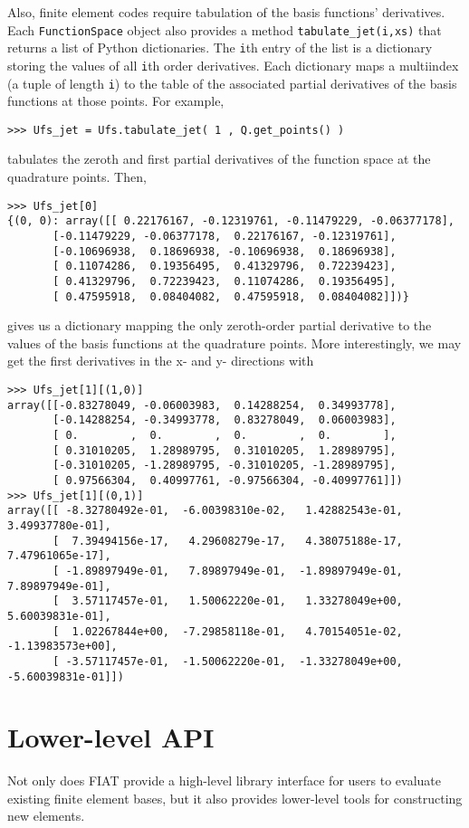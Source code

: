 \documentclass{fenicsmanual}
\begin{document}
Also, finite element codes require tabulation of the basis functions'
derivatives.  Each \verb/FunctionSpace/ object also provides a method
\verb/tabulate_jet(i,xs)/ that returns a list of Python dictionaries.
The \verb.i.th entry of the list is a dictionary storing the values of
all \verb.i.th order derivatives.  Each dictionary maps a multiindex
(a tuple of length \verb.i.) to the table of the associated partial
derivatives of the basis functions at those points.  For example,
\begin{verbatim}
>>> Ufs_jet = Ufs.tabulate_jet( 1 , Q.get_points() )
\end{verbatim}
tabulates the zeroth and first partial derivatives of the function
space at the quadrature points.  Then,
\begin{verbatim}
>>> Ufs_jet[0]
{(0, 0): array([[ 0.22176167, -0.12319761, -0.11479229, -0.06377178],
       [-0.11479229, -0.06377178,  0.22176167, -0.12319761],
       [-0.10696938,  0.18696938, -0.10696938,  0.18696938],
       [ 0.11074286,  0.19356495,  0.41329796,  0.72239423],
       [ 0.41329796,  0.72239423,  0.11074286,  0.19356495],
       [ 0.47595918,  0.08404082,  0.47595918,  0.08404082]])}
\end{verbatim}
gives us a dictionary mapping the only zeroth-order partial derivative
to the values of the basis functions at the quadrature points.  More
interestingly, we may get the first derivatives in the x- and y-
directions with
\begin{verbatim}
>>> Ufs_jet[1][(1,0)]
array([[-0.83278049, -0.06003983,  0.14288254,  0.34993778],
       [-0.14288254, -0.34993778,  0.83278049,  0.06003983],
       [ 0.        ,  0.        ,  0.        ,  0.        ],
       [ 0.31010205,  1.28989795,  0.31010205,  1.28989795],
       [-0.31010205, -1.28989795, -0.31010205, -1.28989795],
       [ 0.97566304,  0.40997761, -0.97566304, -0.40997761]])
>>> Ufs_jet[1][(0,1)] 
array([[ -8.32780492e-01,  -6.00398310e-02,   1.42882543e-01,   3.49937780e-01],
       [  7.39494156e-17,   4.29608279e-17,   4.38075188e-17,   7.47961065e-17],
       [ -1.89897949e-01,   7.89897949e-01,  -1.89897949e-01,   7.89897949e-01],
       [  3.57117457e-01,   1.50062220e-01,   1.33278049e+00,   5.60039831e-01],
       [  1.02267844e+00,  -7.29858118e-01,   4.70154051e-02,  -1.13983573e+00],
       [ -3.57117457e-01,  -1.50062220e-01,  -1.33278049e+00,  -5.60039831e-01]])
\end{verbatim}


\chapter{Lower-level API}
Not only does FIAT provide a high-level library interface for users to
evaluate existing finite element bases, but it also provides
lower-level tools for constructing new elements.
\end{document}
